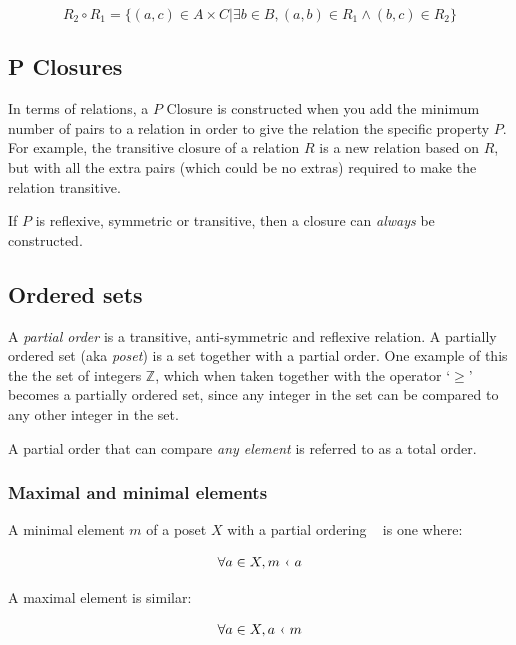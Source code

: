 \[
	R_2 \circ R_1 = \{(a,c) \in A \times C | \exists b \in B, (a,b) \in R_1 \wedge (b,c) \in R_2 \}
\]


\subsection{P Closures}

In terms of relations, a $P$ Closure is constructed when you add the minimum
number of pairs to a relation in order to give the relation the specific
property $P$. For example, the transitive closure of a relation $R$ is a new
relation based on $R$, but with all the extra pairs (which could be no extras)
required to make the relation transitive.

If $P$ is reflexive, symmetric or transitive, then a closure can {\it always} be
constructed.

\subsection{Ordered sets}

A {\it partial order} is a transitive, anti-symmetric and reflexive relation. A
partially ordered set (aka {\it poset}) is a set together with a partial order.
One example of this the the set of integers $\mathbb{Z}$, which when taken
together with the operator `$\geq$' becomes a partially ordered set, since any
integer in the set can be compared to any other integer in the set.

A partial order that can compare {\it any element} is referred to as a total
order.

\subsubsection{Maximal and minimal elements}

A minimal element $m$ of a poset $X$ with a partial ordering \guilsinglleft~
is one where:

\[
	\forall a \in X, m~\textrm{\guilsinglleft}~a
\]

A maximal element is similar:


\[
	\forall a \in X, a~\textrm{\guilsinglleft}~m
\]